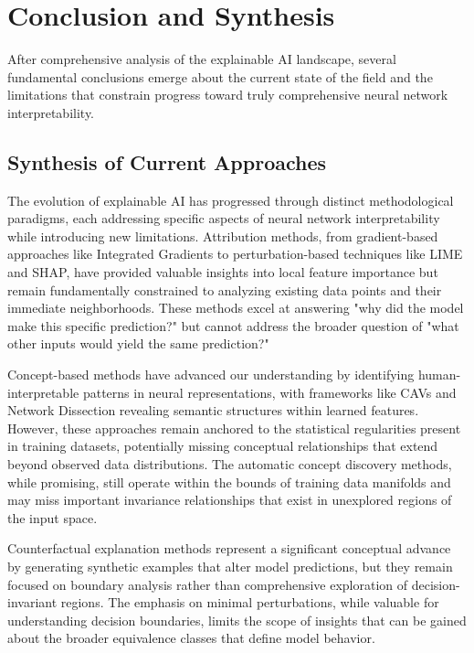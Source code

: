 \documentclass[licencjacka,en]{pracamgr}
\begin{document}
\section{Conclusion and Synthesis}

After comprehensive analysis of the explainable AI landscape, several fundamental conclusions emerge about the current state of the field and the limitations that constrain progress toward truly comprehensive neural network interpretability.

\subsection{Synthesis of Current Approaches}

The evolution of explainable AI has progressed through distinct methodological paradigms, each addressing specific aspects of neural network interpretability while introducing new limitations. Attribution methods, from gradient-based approaches like Integrated Gradients to perturbation-based techniques like LIME and SHAP, have provided valuable insights into local feature importance but remain fundamentally constrained to analyzing existing data points and their immediate neighborhoods. These methods excel at answering "why did the model make this specific prediction?" but cannot address the broader question of "what other inputs would yield the same prediction?"

Concept-based methods have advanced our understanding by identifying human-interpretable patterns in neural representations, with frameworks like CAVs and Network Dissection revealing semantic structures within learned features. However, these approaches remain anchored to the statistical regularities present in training datasets, potentially missing conceptual relationships that extend beyond observed data distributions. The automatic concept discovery methods, while promising, still operate within the bounds of training data manifolds and may miss important invariance relationships that exist in unexplored regions of the input space.

Counterfactual explanation methods represent a significant conceptual advance by generating synthetic examples that alter model predictions, but they remain focused on boundary analysis rather than comprehensive exploration of decision-invariant regions. The emphasis on minimal perturbations, while valuable for understanding decision boundaries, limits the scope of insights that can be gained about the broader equivalence classes that define model behavior.
\end{document}
